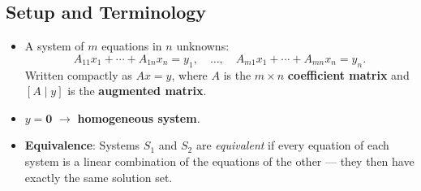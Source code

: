 \documentclass[hidelinks]{article}
\begin{document}
\subsection{Setup and Terminology}
\begin{itemize}
    \item A system of $m$ equations in $n$ unknowns:
    \[
        A_{11}x_1 + \cdots + A_{1n}x_n = y_1, \quad \ldots, \quad A_{m1}x_1 + \cdots + A_{mn}x_n = y_n.
    \]
    Written compactly as $Ax = y$, where $A$ is the $m\times n$ \textbf{coefficient matrix} and $[A \mid y]$ is the \textbf{augmented matrix}.
    \item $y = \mathbf{0}$ $\rightarrow$ \textbf{homogeneous system}.
    \item \textbf{Equivalence}: Systems $S_1$ and $S_2$ are \emph{equivalent} if every equation of each system is a linear combination of the equations of the other — they then have exactly the same solution set.
\end{itemize}
\end{document}
